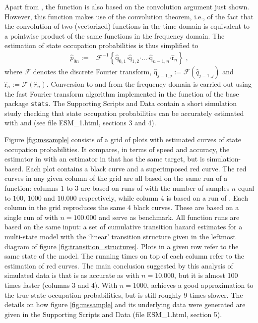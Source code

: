 Apart from , the function  is also based on the convolution argument just shown. 
However, this function makes use of the convolution theorem, i.e., of the fact that the convolution of two (vectorized) functions in the time domain is equivalent to a pointwise product of the same functions in the frequency domain. The estimation of state occupation probabilities is thus simplified to
\begin{align*}
 \hat{p}_{0n}:=&\mathcal{F}^{\scriptscriptstyle -1}\left\lbrace \hat{\mathrm q}_{0,1} \boldsymbol{\cdot} \hat{\mathrm q}_{1,2}\boldsymbol{\cdot} \mathrm{...}\boldsymbol{\cdot}\hat{\mathrm q}_{n-1,n}\boldsymbol \cdot \hat{\mathrm r}_{n}\right\rbrace\;, 
\end{align*}
where $\mathcal{F}$ denotes the discrete Fourier transform, $\hat{\mathrm{q}}_{j-1,j}:=\mathcal{F}(\hat{q}_{j-1,j})$ and  $\hat{\mathrm{r}}_{n}:=\mathcal{F}(\hat{r}_{n})$.
Conversion to and from the frequency domain is carried out using the fast Fourier transform algorithm implemented in the  function of the base package \texttt{stats}.
The Supporting Scripts and Data contain a short simulation study checking that state occupation probabilities can be accurately estimated with  and   (see file ESM\_1.html, sections 3 and 4).


Figure \ref{fig:mssample} consists of a grid of plots with estimated curves of state occupation probabilities. It compares, in terms of speed and accuracy,  the estimator in  with an estimator in  that has the same target, but is simulation-based.  Each plot contains a black curve and a superimposed red curve.  The red curves in any given column of the grid are all based on the same run of a function: columns 1 to 3 are based on runs of  with the number of samples $n$ equal to $100$, $1000$ and $10.000$ respectively, while column 4 is based on a run of .  Each column in the grid reproduces the same 4 black curves. These are based on a single run of  with $n=100.000$ and serve as benchmark. All function runs are based on the same input: a set of cumulative transition hazard estimates for a multi-state model with the `linear' transition structure given in the leftmost diagram of figure \ref{fig:transition_structures}. Plots in a given row refer to the same state of the model. The running times on top of each column refer to the estimation of red curves. 
The main conclusion suggested by this analysis of simulated data is that   is as accurate as  with $n=10.000$, but it is almost 100 times faster (columns 3 and 4).  With $n=1000$,  achieves a good approximation to the true state occupation probabilities, but is still roughly 9 times slower.  The details on how figure \ref{fig:mssample} and its underlying data were generated are given in the Supporting Scripts and Data (file ESM\_1.html, section 5).



